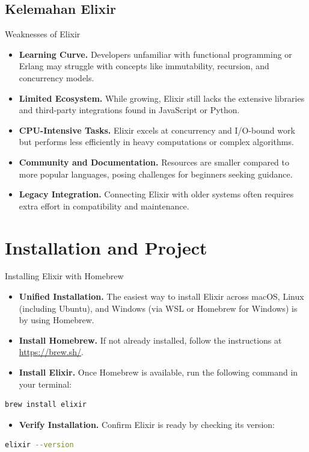 \documentclass[aspectratio=169, table]{beamer}
\begin{document}
\subsection{Kelemahan Elixir}

\begin{frame}{Weaknesses of Elixir}
	\vspace{20pt}
	\begin{itemize}
		\item \textbf{Learning Curve.} Developers unfamiliar with functional programming or Erlang may struggle with concepts like immutability, recursion, and concurrency models.  
		\item \textbf{Limited Ecosystem.} While growing, Elixir still lacks the extensive libraries and third-party integrations found in JavaScript or Python.  
		\item \textbf{CPU-Intensive Tasks.} Elixir excels at concurrency and I/O-bound work but performs less efficiently in heavy computations or complex algorithms.  
		\item \textbf{Community and Documentation.} Resources are smaller compared to more popular languages, posing challenges for beginners seeking guidance.  
		\item \textbf{Legacy Integration.} Connecting Elixir with older systems often requires extra effort in compatibility and maintenance.  
	\end{itemize}
\end{frame}

\section{Installation and Project}

\begin{frame}[fragile]{Installing Elixir with Homebrew}
	\vspace{20pt}
	\begin{itemize}
		\item \textbf{Unified Installation.} The easiest way to install Elixir across macOS, Linux (including Ubuntu), and Windows (via WSL or Homebrew for Windows) is by using Homebrew.  
		\item \textbf{Install Homebrew.} If not already installed, follow the instructions at \url{https://brew.sh/}.  
		\item \textbf{Install Elixir.} Once Homebrew is available, run the following command in your terminal:
	\end{itemize}
	
	\begin{lstlisting}[language=bash]
		brew install elixir
	\end{lstlisting}
	
	\begin{itemize}
		\item \textbf{Verify Installation.} Confirm Elixir is ready by checking its version:
	\end{itemize}
	
	\begin{lstlisting}[language=bash]
		elixir --version
	\end{lstlisting}
\end{frame}
\end{document}
